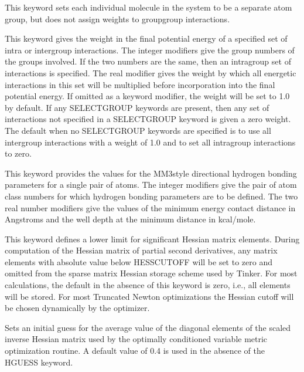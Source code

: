 \documentclass[letterpaper,11pt,english]{sphinxmanual}
\begin{document}
  This keyword sets each individual molecule in the system to be a separate atom group, but does not assign weights to group\sphinxhyphen{}group interactions.

  This keyword gives the weight in the final potential energy of a specified set of intra\sphinxhyphen{} or intergroup interactions. The integer modifiers give the group numbers of the groups involved. If the two numbers are the same, then an intragroup set of interactions is specified. The real modifier gives the weight by which all energetic interactions in this set will be multiplied before incorporation into the final potential energy. If omitted as a keyword modifier, the weight will be set to 1.0 by default. If any SELECT\sphinxhyphen{}GROUP keywords are present, then any set of interactions not specified in a SELECT\sphinxhyphen{}GROUP keyword is given a zero weight. The default when no SELECT\sphinxhyphen{}GROUP keywords are specified is to use all intergroup interactions with a weight of 1.0 and to set all intragroup interactions to zero.

  This keyword provides the values for the MM3\sphinxhyphen{}style directional hydrogen bonding parameters for a single pair of atoms. The integer modifiers give the pair of atom class numbers for which hydrogen bonding parameters are to be defined. The two real number modifiers give the values of the minimum energy contact distance in Angstroms and the well depth at the minimum distance in kcal/mole.

  This keyword defines a lower limit for significant Hessian matrix elements. During computation of the Hessian matrix of partial second derivatives, any matrix elements with absolute value below HESS\sphinxhyphen{}CUTOFF will be set to zero and omitted from the sparse matrix Hessian storage scheme used by Tinker. For most calculations, the default in the absence of this keyword is zero, i.e., all elements will be stored. For most Truncated Newton optimizations the Hessian cutoff will be chosen dynamically by the optimizer.

  Sets an initial guess for the average value of the diagonal elements of the scaled inverse Hessian matrix used by the optimally conditioned variable metric optimization routine. A default value of 0.4 is used in the absence of the HGUESS keyword.
\end{document}
